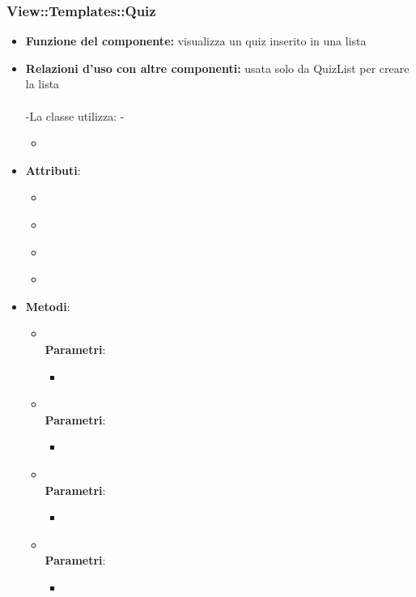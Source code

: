 \subsubsection{View::Templates::Quiz}
\begin{itemize}
\item\textbf{Funzione del componente:} visualizza un quiz inserito in una lista
				\item\textbf{Relazioni d'uso con altre componenti:} usata solo da QuizList per creare la lista\\ \\
 -La classe utilizza:
 -	\begin{itemize}
 		\item
 	\end{itemize}
 \item\textbf{Attributi}:
 	\begin{itemize}
 		\item\code{}\\
 		\item\code{}\\
 		\item\code{}\\
 		\item\code{}\\
 	\end{itemize}
 \item\textbf{Metodi}:
 	\begin{itemize}
 		\item\code{}\\
 		\textbf{Parametri}:
 			\begin{itemize}
 				\item\code{}\\
 			\end{itemize}
 		\item\code{}\\
 		\textbf{Parametri}:
 			\begin{itemize}
 				\item\code{}\\
 			\end{itemize}
 		\item\code{}\\
 		\textbf{Parametri}:
 			\begin{itemize}
 				\item\code{}\\
 			\end{itemize}
 		\item\code{}\\
 		\textbf{Parametri}:
 			\begin{itemize}
 				\item\code{}\\
 			\end{itemize}
 	\end{itemize}
 \end{itemize}
 
